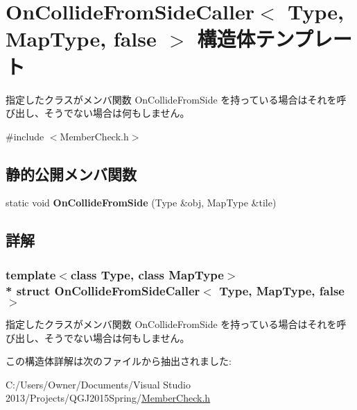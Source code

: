 \hypertarget{struct_on_collide_from_side_caller_3_01_type_00_01_map_type_00_01false_01_4}{}\section{On\+Collide\+From\+Side\+Caller$<$ Type, Map\+Type, false $>$ 構造体テンプレート}
\label{struct_on_collide_from_side_caller_3_01_type_00_01_map_type_00_01false_01_4}


指定したクラスがメンバ関数 On\+Collide\+From\+Side を持っている場合はそれを呼び出し、そうでない場合は何もしません。 




{\ttfamily \#include $<$Member\+Check.\+h$>$}

\subsection*{静的公開メンバ関数}
\begin{DoxyCompactItemize}
\item 
static void {\bfseries On\+Collide\+From\+Side} (Type \&obj, Map\+Type \&tile)\hypertarget{struct_on_collide_from_side_caller_3_01_type_00_01_map_type_00_01false_01_4_ac9d10372408412df626187e8fed89fc2}{}\label{struct_on_collide_from_side_caller_3_01_type_00_01_map_type_00_01false_01_4_ac9d10372408412df626187e8fed89fc2}

\end{DoxyCompactItemize}


\subsection{詳解}
\subsubsection*{template$<$class Type, class Map\+Type$>$\\*
struct On\+Collide\+From\+Side\+Caller$<$ Type, Map\+Type, false $>$}

指定したクラスがメンバ関数 On\+Collide\+From\+Side を持っている場合はそれを呼び出し、そうでない場合は何もしません。



この構造体詳解は次のファイルから抽出されました\+:\begin{DoxyCompactItemize}
\item 
C\+:/\+Users/\+Owner/\+Documents/\+Visual Studio 2013/\+Projects/\+Q\+G\+J2015\+Spring/\hyperlink{_member_check_8h}{Member\+Check.\+h}\end{DoxyCompactItemize}
